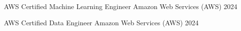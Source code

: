 

\begin{cvhonors}

\cvhonor
    {AWS Certified Machine Learning Engineer} %
    {Amazon Web Services (AWS)} %
    {} %
    {2024} %

\cvhonor
    {AWS Certified Data Engineer} %
    {Amazon Web Services (AWS)} %
    {} %
    {2024} %

\end{cvhonors}